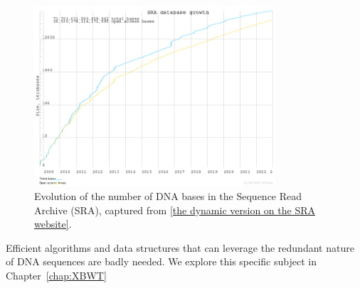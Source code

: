 \begin{figure}
    \begin{center}
        \includegraphics[width=0.8\textwidth]{Introduction/sra_database_growth.png}
        \caption{Evolution of the number of DNA bases in the Sequence Read Archive (SRA), captured from \href{https://www.ncbi.nlm.nih.gov/sra/docs/sragrowth/}{[the dynamic version on the SRA website]}.}
        \label{fig:intro:sra}
    \end{center}
\end{figure}

Efficient algorithms and data structures that can leverage the redundant nature of DNA sequences are badly needed. We explore this specific subject in Chapter~\ref{chap:XBWT}

